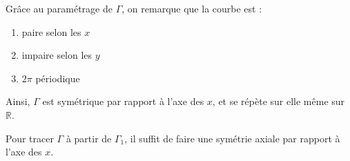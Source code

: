 Grâce au paramétrage de $\Gamma$, on remarque que la courbe est :
\begin{enumerate}[label=\arabic*. ]
  \item paire selon les $x$
  \item impaire selon les $y$
  \item $2\pi$ périodique
\end{enumerate}
Ainsi, $\Gamma$ est symétrique par rapport à l'axe des $x$, et se répète sur elle même sur $\mathbb{R}$.\\
\begin{result}
  Pour tracer $\Gamma$ à partir de $\Gamma_1$, il suffit de faire une symétrie axiale par rapport à l'axe des $x$.
\end{result}
